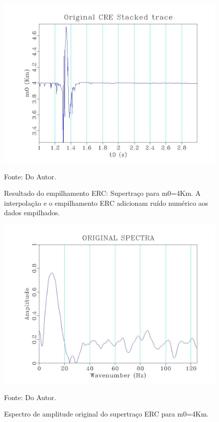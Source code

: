 \begin{figure}
\caption{Resultado do empilhamento ERC: Supertraço para m0=4Km. A interpolação e o empilhamento ERC adicionam
ruído numérico aos dados empilhados.}
\begin{center}
\includegraphics[scale=0.4]{images/creStackedSection.jpeg}
\vspace{-0.3cm}
\end{center}
\begin{center}
 Fonte: Do Autor.
\end{center}
\label{fig:7.2}
\end{figure}

\begin{figure}
\caption{Espectro de amplitude original do supertraço ERC para m0=4Km.}
\begin{center}
\includegraphics[scale=0.4]{images/originalSpectra.jpeg}
\vspace{-0.3cm}
\end{center}
\begin{center}
 Fonte: Do Autor.
\end{center}
\label{fig:7.3}
\end{figure}

